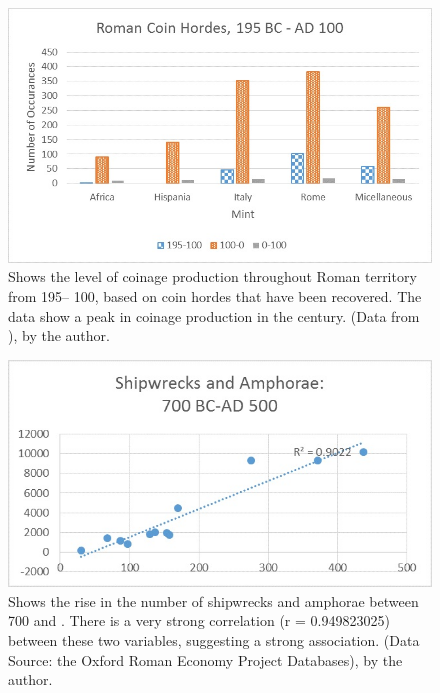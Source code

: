 	
	\begin{figure}[!p]
		\includegraphics[width=\linewidth]{figures/Davis_Agroeconomy_Fig6.jpg}
		\centering
		\caption{Shows the level of coinage production throughout Roman territory from 195\BC – 100\AD, based on coin hordes that have been recovered. The data show a peak in coinage production in the  century\BC. (Data from \textcite{Lockyear_2013}), by the author.}
		\label{fig:DavisFig6}
	\end{figure}
	
	
	
	\begin{figure}[!p]
		\includegraphics[width=\linewidth]{figures/Davis_Agroeconomy_Fig7a.jpg}
		\centering
		\caption{Shows the rise in the number of shipwrecks and amphorae between 700 \BC and . There is a very strong correlation (r = \num{0.949823025}) between these two variables, suggesting a strong association. (Data Source: the Oxford Roman Economy Project Databases), by the author.}
		\label{fig:DavisFig7a}
	\end{figure}
	
	
	
